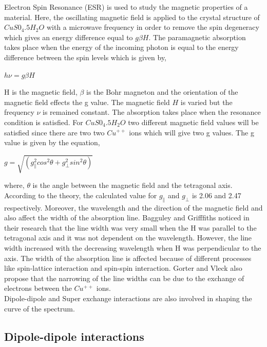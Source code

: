 \documentclass[openany,11pt,a4paper]{report}
\begin{document}
Electron Spin Resonance (ESR) is used to study the magnetic properties of a material. Here, the oscillating magnetic field is applied to the crystal structure of $CuS0_{4}.5H_{2}O$  with a microwave frequency in order to remove the spin degeneracy which gives an energy difference equal to $g\beta H$. The paramagnetic absorption takes place when the energy of the incoming photon is equal to the energy difference between the spin levels which is given by, 
\begin{center}
$h\nu=g\beta H$
\end{center}
H is the magnetic field, $\beta$ is the Bohr magneton and the orientation of the magnetic field effects the g value. The magnetic field $H$ is varied but the frequency $\nu$ is remained constant. The absorption takes place when the resonance condition is satisfied. For $CuS0_{4}.5H_{2}O$ two different magnetic field values will be satisfied since there are two two $Cu^{++}$ ions which will give two g values. The g value is given by the equation,
\begin{center}
$g=\sqrt{(g_{\parallel}^{2}cos^{2}\theta+g_{\perp}^{2}sin^{2}\theta)}$
\end{center}
where, $\theta$ is the angle between the magnetic field and the tetragonal axis. 
According to the theory, the calculated value for $g_{\parallel}$ and $g_{\perp}$ is 2.06 and 2.47 respectively. \cite{general} 
Moreover, the wavelength and the direction of the magnetic field and also affect the width of the absorption line. Bagguley and Grifffiths noticed in their research that the line width was very small when the H was parallel to the tetragonal axis and it was not dependent on the wavelength. However, the line width increased with the decreasing wavelength when H was perpendicular to the axis. The width of the absorption line is affected because of different processes like spin-lattice interaction and spin-spin interaction. Gorter and Vleck also propose that the narrowing of the line widths can be due to the exchange of electrons between the $Cu^{++}$ ions. \cite{crystalepr} \\


Dipole-dipole and Super exchange interactions are also involved in shaping the curve of the spectrum. 


\subsection{Dipole-dipole interactions}
\end{document}
